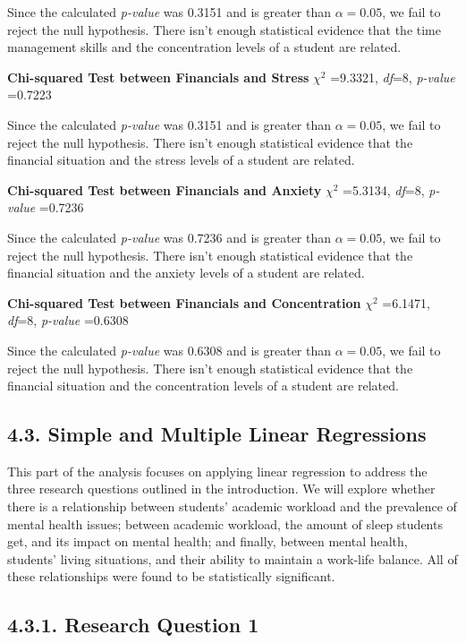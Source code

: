 \documentclass[
  letterpaper,
  DIV=11,
  numbers=noendperiod]{scrartcl}
\begin{document}
Since the calculated \emph{p-value} was 0.3151 and is greater than
\(\alpha=0.05\), we fail to reject the null hypothesis. There isn't
enough statistical evidence that the time management skills and the
concentration levels of a student are related.

\textbf{Chi-squared Test between Financials and Stress} \(\chi^2\)
=9.3321, \emph{df}=8, \emph{p-value} =0.7223

Since the calculated \emph{p-value} was 0.3151 and is greater than
\(\alpha=0.05\), we fail to reject the null hypothesis. There isn't
enough statistical evidence that the financial situation and the stress
levels of a student are related.

\textbf{Chi-squared Test between Financials and Anxiety} \(\chi^2\)
=5.3134, \emph{df}=8, \emph{p-value} =0.7236

Since the calculated \emph{p-value} was 0.7236 and is greater than
\(\alpha=0.05\), we fail to reject the null hypothesis. There isn't
enough statistical evidence that the financial situation and the anxiety
levels of a student are related.

\textbf{Chi-squared Test between Financials and Concentration}
\(\chi^2\) =6.1471, \emph{df}=8, \emph{p-value} =0.6308

Since the calculated \emph{p-value} was 0.6308 and is greater than
\(\alpha=0.05\), we fail to reject the null hypothesis. There isn't
enough statistical evidence that the financial situation and the
concentration levels of a student are related.

\subsection{4.3. Simple and Multiple Linear
Regressions}\label{simple-and-multiple-linear-regressions}

This part of the analysis focuses on applying linear regression to
address the three research questions outlined in the introduction. We
will explore whether there is a relationship between students' academic
workload and the prevalence of mental health issues; between academic
workload, the amount of sleep students get, and its impact on mental
health; and finally, between mental health, students' living situations,
and their ability to maintain a work-life balance. All of these
relationships were found to be statistically significant.

\subsection{4.3.1. Research Question 1}\label{research-question-1}
\end{document}
